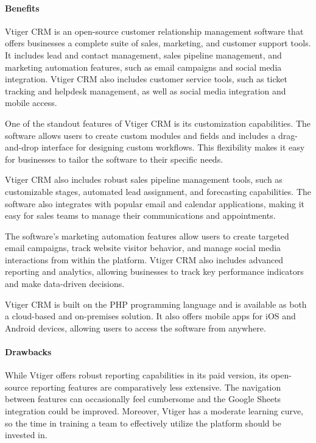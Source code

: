 \documentclass{article}
\begin{document}
\paragraph{Benefits}

Vtiger CRM is an open-source customer relationship management software that offers businesses a complete suite of sales, marketing, and customer support tools. It includes lead and contact management, sales pipeline management, and marketing automation features, such as email campaigns and social media integration. Vtiger CRM also includes customer service tools, such as ticket tracking and helpdesk management, as well as social media integration and mobile access.

One of the standout features of Vtiger CRM is its customization capabilities. The software allows users to create custom modules and fields and includes a drag-and-drop interface for designing custom workflows. This flexibility makes it easy for businesses to tailor the software to their specific needs.

Vtiger CRM also includes robust sales pipeline management tools, such as customizable stages, automated lead assignment, and forecasting capabilities. The software also integrates with popular email and calendar applications, making it easy for sales teams to manage their communications and appointments.

The software's marketing automation features allow users to create targeted email campaigns, track website visitor behavior, and manage social media interactions from within the platform. Vtiger CRM also includes advanced reporting and analytics, allowing businesses to track key performance indicators and make data-driven decisions.

Vtiger CRM is built on the PHP programming language and is available as both a cloud-based and on-premises solution. It also offers mobile apps for iOS and Android devices, allowing users to access the software from anywhere.

\paragraph{Drawbacks}

While Vtiger offers robust reporting capabilities in its paid version, its open-source reporting features are comparatively less extensive. The navigation between features can occasionally feel cumbersome and the Google Sheets integration could be improved. Moreover, Vtiger has a moderate learning curve, so the time in training a team to effectively utilize the platform should be invested in.
\end{document}
